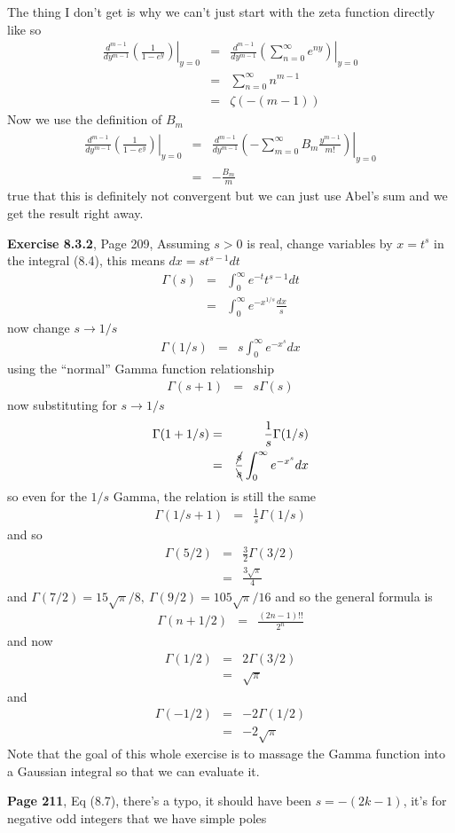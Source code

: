 \documentclass[aps,preprint,preprintnumbers,nofootinbib,showpacs,prd]{revtex4-1}
\newcommand{\nbea}{\begin{eqnarray*}}
\newcommand{\neea}{\end{eqnarray*}}
\begin{document}
The thing I don't get is why we can't just start with the zeta function directly like so
%
\nbea
\left.\frac{d^{m-1}}{dy^{m-1}} \left(\frac{1}{1 - e^{y}}\right)\right|_{y=0} & = & \left.\frac{d^{m-1}}{dy^{m-1}} \left(\sum_{n=0}^\infty e^{ny}\right)\right|_{y=0} \\
& = & \sum_{n=0}^\infty n^{m-1} \\
& = & \zeta(-(m-1))
\neea
%
Now we use the definition of $B_m$
%
\nbea
\left.\frac{d^{m-1}}{dy^{m-1}} \left(\frac{1}{1 - e^{y}}\right)\right|_{y=0} & = & \left.\frac{d^{m-1}}{dy^{m-1}}\left(- \sum_{m=0}^\infty B_m \frac{y^{m-1}}{m!}\right)\right|_{y=0} \\
& = & -\frac{B_m}{m}
\neea
%
true that this is definitely not convergent but we can just use Abel's sum and we get the result right away.

{\bf Exercise 8.3.2}, Page 209, Assuming $s>0$ is real, change variables by $x=t^s$ in the integral (8.4), this means $dx=st^{s-1}dt$
%
\nbea
\Gamma(s) & = & \int_0^\infty e^{-t}t^{s-1}dt \\
& = & \int_0^\infty e^{-x^{1/s}} \frac{dx}{s}
\neea
%
now change $s\to 1/s$
%
\nbea
\Gamma(1/s) & = & s \int_0^\infty e^{-x^s} dx
\neea
%
using the ``normal'' Gamma function relationship
%
\nbea
\Gamma(s+1) & = & s\Gamma(s)
\neea
%
now substituting for $s\to1/s$
%
\nbea
\Gamma(1+1/s) & = & \frac{1}{s}\Gamma(1/s) \\
& = & \frac{\cancel{s}}{\bcancel{s}} \int_0^\infty e^{-x^s} dx
\neea
%
so even for the $1/s$ Gamma, the relation is still the same
%
\nbea
\Gamma(1/s+1) & = & \frac{1}{s}\Gamma(1/s)
\neea
%
and so
%
\nbea
\Gamma(5/2) & = & \frac{3}{2} \Gamma(3/2) \\
& = & \frac{3\sqrt{\pi}}{4}
\neea
%
and $\Gamma(7/2) = 15\sqrt{\pi}/8,~\Gamma(9/2) = 105\sqrt{\pi}/16$ and so the general formula is
%
\nbea
\Gamma(n+1/2) & = & \frac{(2n-1)!!}{2^n}
\neea
%
and now
%
\nbea
\Gamma(1/2) & = & 2 \Gamma(3/2) \\
& = & \sqrt{\pi}
\neea
%
and
%
\nbea
\Gamma(-1/2) & = & -2 \Gamma(1/2) \\
& = & -2\sqrt{\pi}
\neea
%
Note that the goal of this whole exercise is to massage the Gamma function into a Gaussian integral so that we can evaluate it.

{\bf Page 211}, Eq (8.7), there's a typo, it should have been $s=-(2k-1)$, it's for negative odd integers that we have simple poles
\end{document}

